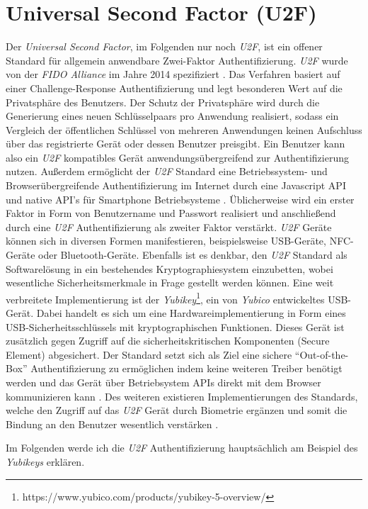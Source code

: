\documentclass[11pt,a4paper,ngerman]{scrreprt}
\begin{document}
\section{Universal Second Factor (U2F)}
Der \textit{Universal Second Factor}, im Folgenden nur noch \textit{U2F}, ist ein offener Standard für allgemein anwendbare Zwei-Faktor Authentifizierung. \textit{U2F} wurde von der \textit{FIDO Alliance} im Jahre 2014 spezifiziert \cite{u2fv1}. Das Verfahren basiert auf einer Challenge-Response Authentifizierung und legt besonderen Wert auf die Privatsphäre des Benutzers. Der Schutz der Privatsphäre wird durch die Generierung eines neuen Schlüsselpaars pro Anwendung realisiert, sodass ein Vergleich der öffentlichen Schlüssel von mehreren Anwendungen keinen Aufschluss über das registrierte Gerät oder dessen Benutzer preisgibt. Ein Benutzer kann also ein \textit{U2F} kompatibles Gerät anwendungsübergreifend zur Authentifizierung nutzen. Außerdem ermöglicht der \textit{U2F} Standard eine Betriebssystem- und Browserübergreifende Authentifizierung im Internet durch eine Javascript API und native API's für Smartphone Betriebsysteme \cite{u2fSpec}. Üblicherweise wird ein erster Faktor in Form von Benutzername und Passwort realisiert und anschließend durch eine \textit{U2F} Authentifizierung als zweiter Faktor verstärkt. \textit{U2F} Geräte können sich in diversen Formen manifestieren, beispielsweise USB-Geräte, NFC-Geräte oder Bluetooth-Geräte. Ebenfalls ist es denkbar, den \textit{U2F} Standard als Softwarelösung in ein  bestehendes Kryptographiesystem einzubetten, wobei wesentliche Sicherheitsmerkmale in Frage gestellt werden können. Eine weit verbreitete Implementierung ist der \textit{Yubikey}\footnote{https://www.yubico.com/products/yubikey-5-overview/}, ein von \textit{Yubico} entwickeltes USB-Gerät. Dabei handelt es sich um eine Hardwareimplementierung in Form eines USB-Sicherheitsschlüssels mit kryptographischen Funktionen. Dieses Gerät ist zusätzlich gegen Zugriff auf die sicherheitskritischen Komponenten (Secure Element) abgesichert. Der Standard setzt sich als Ziel eine sichere ``Out-of-the-Box'' Authentifizierung zu ermöglichen indem keine weiteren Treiber benötigt werden und das Gerät über Betriebsystem APIs direkt mit dem Browser kommunizieren kann \cite{u2fSpec}. Des weiteren existieren Implementierungen des Standards, welche den Zugriff auf das \textit{U2F} Gerät durch Biometrie ergänzen und somit die Bindung an den Benutzer wesentlich verstärken \cite{eyelock}.

Im Folgenden werde ich die \textit{U2F} Authentifizierung hauptsächlich am Beispiel des \textit{Yubikeys} erklären.
\end{document}
